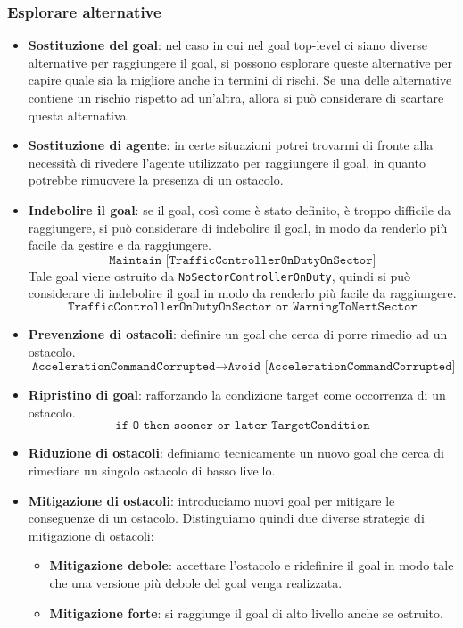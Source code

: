 \subsubsection{Esplorare alternative}
\begin{itemize}
    \item \textbf{Sostituzione del goal}: 
    nel caso in cui nel goal top-level ci siano diverse alternative per raggiungere
    il goal, si possono esplorare queste alternative per capire quale sia la migliore anche 
    in termini di rischi. Se una delle alternative contiene un rischio rispetto ad un'altra,
    allora si può considerare di scartare questa alternativa.
    
    \item \textbf{Sostituzione di agente}: 
    in certe situazioni potrei trovarmi di fronte alla necessità di rivedere l'agente utilizzato
    per raggiungere il goal, in quanto potrebbe rimuovere la presenza di un ostacolo.

    \item \textbf{Indebolire il goal}: se il goal, così come è stato definito, è troppo difficile
    da raggiungere, si può considerare di indebolire il goal, in modo da renderlo più facile da
    gestire e da raggiungere.
    \[
    \texttt{Maintain [TrafficControllerOnDutyOnSector]}
    \]
    Tale goal viene ostruito da \texttt{NoSectorControllerOnDuty}, quindi si può considerare di
    indebolire il goal in modo da renderlo più facile da raggiungere.
    \[
    \texttt{TrafficControllerOnDutyOnSector or WarningToNextSector}
    \]
    \item \textbf{Prevenzione di ostacoli}: definire un goal che cerca di porre rimedio ad un ostacolo.
    \[
        \texttt{AccelerationCommandCorrupted} \rightarrow \texttt{Avoid [AccelerationCommandCorrupted]}
    \]
    \item \textbf{Ripristino di goal}: rafforzando la condizione target come occorrenza di un ostacolo.
    \[
        \texttt{if O then sooner-or-later TargetCondition}
    \]
    \item \textbf{Riduzione di ostacoli}: definiamo tecnicamente un nuovo goal che cerca di rimediare un singolo 
    ostacolo di basso livello.
    
    \item \textbf{Mitigazione di ostacoli}: introduciamo nuovi goal per mitigare le conseguenze di
    un ostacolo. Distinguiamo quindi due diverse strategie di mitigazione di ostacoli:
    \begin{itemize}   
        \item \textbf{Mitigazione debole}: accettare l'ostacolo e  ridefinire il goal in modo tale 
        che una versione più debole del goal venga realizzata.
        \item \textbf{Mitigazione forte}: si raggiunge il goal di alto livello anche se ostruito. 
    \end{itemize}

\end{itemize}
